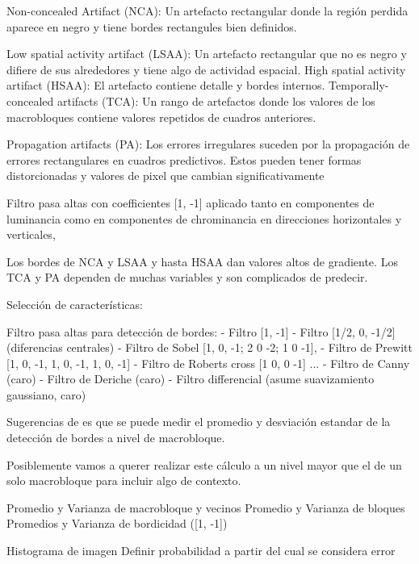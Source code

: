 Non-concealed Artifact (NCA): Un artefacto rectangular donde la región perdida aparece en negro y tiene bordes rectangules bien definidos.

Low spatial activity artifact (LSAA): Un artefacto rectangular que no es negro y difiere de sus alrededores y tiene algo de actividad espacial.
High spatial activity artifact (HSAA): El artefacto contiene detalle y bordes internos.
Temporally-concealed artifacts (TCA): Un rango de artefactos donde los valores de los macrobloques contiene valores repetidos de cuadros anteriores.

Propagation artifacts (PA): Los errores irregulares suceden por la propagación de errores rectangulares en cuadros predictivos. Estos pueden tener formas distorcionadas y valores de pixel que cambian significativamente

Filtro pasa altas con coefficientes [1, -1] aplicado tanto en componentes de luminancia como en componentes de chrominancia en direcciones horizontales y verticales,

Los bordes de NCA y LSAA y hasta HSAA dan valores altos de gradiente.
Los TCA y PA dependen de muchas variables y son complicados de predecir.

Selección de características:

Filtro pasa altas para detección de bordes:
- Filtro [1, -1]
- Filtro [1/2, 0, -1/2] (diferencias centrales)
- Filtro de Sobel [1, 0, -1; 2 0 -2; 1 0 -1], \cite{Korhonen2018}
- Filtro de Prewitt [1, 0, -1, 1, 0, -1, 1, 0, -1]
- Filtro de Roberts cross [1 0, 0 -1]
...
- Filtro de Canny (caro)
- Filtro de Deriche (caro)
- Filtro differencial (asume suavizamiento gaussiano, caro)

Sugerencias de \cite{Glavota2016, Korhonen2018} es que se puede medir el promedio y desviación estandar de la detección de bordes a nivel de macrobloque.

Posiblemente vamos a querer realizar este cálculo a un nivel mayor que el de un solo macrobloque para incluir algo de contexto.

Promedio y Varianza de macrobloque y vecinos
Promedio y Varianza de bloques
Promedios y Varianza de bordicidad ([1, -1])

Histograma de imagen
Definir probabilidad a partir del cual se considera error



